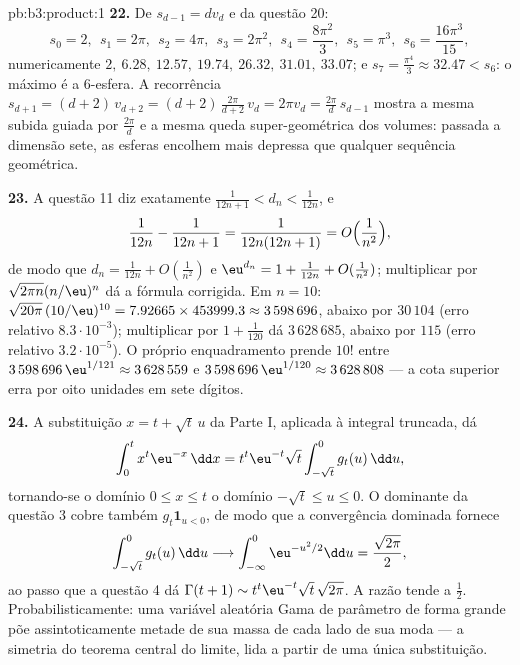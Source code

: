 \begin{solution}{pb:b3:product:1}
\textbf{22.} De $s_{d-1} = dv_d$ e da questão 20:
\[
s_0 = 2,\ \ s_1 = 2\pi,\ \ s_2 = 4\pi,\ \ s_3 = 2\pi^2,\ \
s_4 = \frac{8\pi^2}3,\ \ s_5 = \pi^3,\ \ s_6 =
\frac{16\pi^3}{15},
\]
numericamente $2,\ 6.28,\ 12.57,\ 19.74,\ 26.32,\ 31.01,\
33.07$; e $s_7 = \frac{\pi^4}3 \approx 32.47 < s_6$: o
máximo é a $6$-esfera. A recorrência $s_{d+1} =
(d+2)\,v_{d+2} = (d+2)\,\frac{2\pi}{d+2}\,v_d = 2\pi v_d =
\frac{2\pi}d\,s_{d-1}$ mostra a mesma subida guiada por $\frac{2\pi}d$
e a mesma queda super-geométrica dos volumes: passada a dimensão
sete, as esferas encolhem mais depressa que qualquer sequência
geométrica.

\textbf{23.} A questão 11 diz exatamente $\frac1{12n+1} < d_n <
\frac1{12n}$, e
\[
\frac1{12n} - \frac1{12n+1} = \frac1{12n(12n+1)} =
O\Bigl(\frac1{n^2}\Bigr),
\]
de modo que $d_n = \frac1{12n} + O(\frac1{n^2})$ e $\eu^{d_n} = 1 +
\frac1{12n} + O(\frac1{n^2})$; multiplicar por
$\sqrt{2\pi n}(n/\eu)^n$ dá a fórmula corrigida. Em $n =
10$: $\sqrt{20\pi}\,(10/\eu)^{10} = 7.92665 \times 453999.3
\approx 3\,598\,696$, abaixo por $30\,104$ (erro relativo
$8.3\cdot10^{-3}$); multiplicar por $1 + \frac1{120}$ dá
$3\,628\,685$, abaixo por $115$ (erro relativo
$3.2\cdot10^{-5}$). O próprio enquadramento prende $10!$ entre
$3\,598\,696\,\eu^{1/121} \approx 3\,628\,559$ e
$3\,598\,696\,\eu^{1/120} \approx 3\,628\,808$ --- a cota superior
erra por oito unidades em sete dígitos.

\textbf{24.} A substituição $x = t + \sqrt t\,u$ da Parte I,
aplicada à integral truncada, dá
\[
\int_0^{t} x^{t}\eu^{-x}\,\dd x
= t^{t}\eu^{-t}\sqrt t\int_{-\sqrt t}^{0} g_t(u)\,\dd u ,
\]
tornando-se o domínio $0 \leq x \leq t$ o domínio $-\sqrt t \leq u \leq
0$. O dominante da questão 3 cobre também $g_t\mathbf 1_{u < 0}$,
de modo que a convergência dominada fornece
\[
\int_{-\sqrt t}^{0}g_t(u)\,\dd u \longrightarrow
\int_{-\infty}^{0}\eu^{-u^2/2}\dd u = \frac{\sqrt{2\pi}}2 ,
\]
ao passo que a questão 4 dá $\Gamma(t+1) \sim
t^t\eu^{-t}\sqrt t\,\sqrt{2\pi}$. A razão tende a
$\frac12$. Probabilisticamente: uma variável aleatória Gama de
parâmetro de forma grande põe assintoticamente metade de sua massa de cada lado
de sua moda --- a simetria do teorema central do limite, lida
a partir de uma única substituição.


\end{solution}
